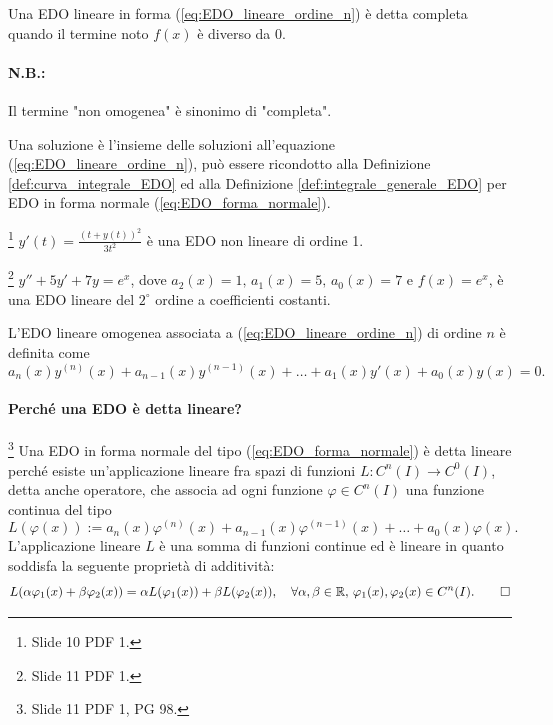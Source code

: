 \begin{definition}
    Una EDO lineare in forma (\ref{eq:EDO_lineare_ordine_n}) è detta completa quando il termine noto $f(x)$ è diverso da 0.
\end{definition}

\paragraph{N.B.:} Il termine "non omogenea" è sinonimo di "completa".

Una soluzione è l'insieme delle soluzioni all'equazione (\ref{eq:EDO_lineare_ordine_n}), può essere ricondotto alla Definizione \ref{def:curva_integrale_EDO} ed alla Definizione \ref{def:integrale_generale_EDO} per EDO in forma normale (\ref{eq:EDO_forma_normale}).

\begin{example}
    \footnote{Slide 10 PDF 1.} $y'(t)=\frac{(t+y(t))^2}{3t^2}$ è una EDO non lineare di ordine 1. 
\end{example}

\begin{example}
    \footnote{Slide 11 PDF 1.} $y''+5y'+7y=e^x$, dove $a_2(x)=1,\, a_1(x)=5,\, a_0(x)=7$ e $f(x)=e^x$, è una EDO lineare del $2^\circ$ ordine a coefficienti costanti.
\end{example}

\begin{definition}\label{def:EDO_lineare_omogenea_ordine_n}
    L'EDO lineare omogenea associata a (\ref{eq:EDO_lineare_ordine_n}) di ordine $n$ è definita come
    \begin{equation}\label{eq:EDO_lineare_omogenea_associata_ordine_n}
        a_n(x)y^{(n)}(x)+a_{n-1}(x)y^{(n-1)}(x)+\hdots+a_1(x)y'(x)+a_0(x)y(x)=0.
    \end{equation}
\end{definition}

\paragraph{Perché una EDO è detta lineare?} \footnote{Slide 11 PDF 1, PG 98.} Una EDO in forma normale del tipo (\ref{eq:EDO_forma_normale}) è detta lineare perché esiste un'\gls{applicazione lineare} fra spazi di funzioni $L\colon C^n(I)\rightarrow C^0(I)$, detta anche operatore, che associa ad ogni funzione $\varphi\in C^n(I)$ una funzione continua del tipo
\begin{equation*}
    L(\varphi(x)):=a_n(x)\varphi^{(n)}(x)+a_{n-1}(x)\varphi^{(n-1)}(x)+\hdots+a_0(x)\varphi(x).
\end{equation*}
L'\gls{applicazione lineare} $L$ è una somma di funzioni continue ed è lineare in quanto soddisfa la seguente proprietà di additività:
\begin{equation*}
    L(\alpha\varphi_1(x)+\beta\varphi_2(x))=\alpha L(\varphi_1(x)) + \beta L(\varphi_2(x)),\quad\forall \alpha,\beta\in\mathbb R,\, \varphi_1(x),\varphi_2(x)\in C^n(I). \qed
\end{equation*}

